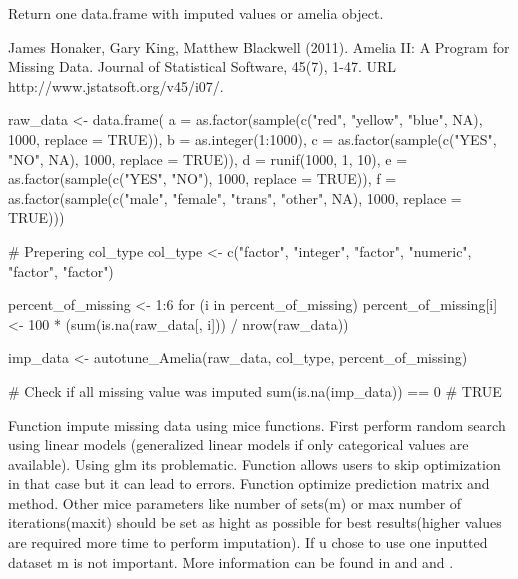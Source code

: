 \documentclass[letterpaper]{book}
\begin{document}
%
\begin{Value}
Return one data.frame with imputed values or amelia object.
\end{Value}
%
\begin{References}\relax
James Honaker, Gary King, Matthew Blackwell (2011). Amelia II: A Program for Missing Data. Journal of Statistical Software, 45(7), 1-47. URL http://www.jstatsoft.org/v45/i07/.
\end{References}
%
\begin{Examples}
\begin{ExampleCode}
{
  raw_data <- data.frame(
    a = as.factor(sample(c("red", "yellow", "blue", NA), 1000, replace = TRUE)),
    b = as.integer(1:1000),
    c = as.factor(sample(c("YES", "NO", NA), 1000, replace = TRUE)),
    d = runif(1000, 1, 10),
    e = as.factor(sample(c("YES", "NO"), 1000, replace = TRUE)),
    f = as.factor(sample(c("male", "female", "trans", "other", NA), 1000, replace = TRUE)))

  # Prepering col_type
  col_type <- c("factor", "integer", "factor", "numeric", "factor", "factor")

  percent_of_missing <- 1:6
  for (i in percent_of_missing) {
    percent_of_missing[i] <- 100 * (sum(is.na(raw_data[, i])) / nrow(raw_data))
  }


  imp_data <- autotune_Amelia(raw_data, col_type, percent_of_missing)

  # Check if all missing value was imputed
  sum(is.na(imp_data)) == 0
  # TRUE
}
\end{ExampleCode}
\end{Examples}
%
\begin{Description}\relax
Function impute missing data using mice functions. First perform  random search using linear models (generalized linear models if only
categorical values are available). Using glm its problematic. Function allows users to skip optimization in that case but it can lead to errors.
Function optimize prediction matrix and method. Other mice parameters like number of sets(m) or max number of iterations(maxit) should be set
as hight as possible for best results(higher values are required more time to perform imputation). If u chose to use one inputted dataset m is not important. More information can be found in  and  and .
\end{Description}
\end{document}
